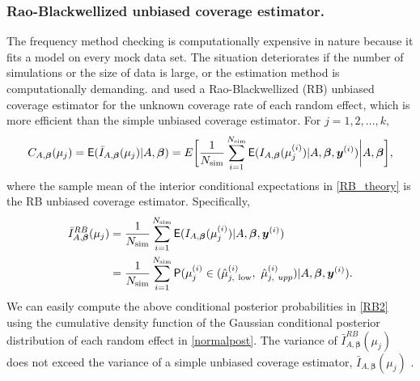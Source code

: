 \documentclass[article]{jss}
\begin{document}
\subsubsection{Rao-Blackwellized unbiased coverage estimator.}
The frequency method checking is computationally expensive in nature because it  fits a model on every mock data set. The situation deteriorates if the number of simulations or the size of data is large, or the estimation method is computationally demanding. \citet{morris1997} and \cite{tang2002fitting} used a Rao-Blackwellized (RB) unbiased coverage estimator for the unknown coverage rate of each random effect, which is more efficient than the simple unbiased coverage estimator.  For $j=1, 2, \ldots, k$,
\begin{equation}\label{RB_theory}
C_{A, \boldsymbol{\beta}}(\mu_j)=\mathsf{E}(\bar{I}_{A, \boldsymbol{\beta}}(\mu_j)\vert A, \boldsymbol{\beta})=E\bigg[\frac{1}{N_{\textrm{sim}}}\sum_{i=1}^{N_{\textrm{sim}}}\mathsf{E}(I_{A, \boldsymbol{\beta}}(\mu_j^{(i)})\vert A, \boldsymbol{\beta}, \boldsymbol{y}^{(i)})\bigg\vert A, \boldsymbol{\beta}\bigg],
\end{equation}
where the sample mean of the interior conditional expectations in \eqref{RB_theory} is the RB unbiased coverage estimator.  Specifically,
\begin{align}
\bar{I}^{RB}_{A, \boldsymbol{\beta}}(\mu_j) &= \frac{1}{N_{\textrm{sim}}}\sum_{i=1}^{N_{\textrm{sim}}}\mathsf{E}(I_{A, \boldsymbol{\beta}}(\mu_j^{(i)})\vert A, \boldsymbol{\beta}, \boldsymbol{y}^{(i)})\label{RB1}\\
&= \frac{1}{N_{\textrm{sim}}}\sum_{i=1}^{N_{\textrm{sim}}} \mathsf{P}(\mu_j^{(i)}\in(\hat{\mu}^{(i)}_{j, ~\textrm{low}}, ~\hat{\mu}^{(i)}_{j, ~upp})\vert A, \boldsymbol{\beta},  \boldsymbol{y}^{(i)}).\label{RB2}
\end{align}
We  can easily compute the above conditional posterior probabilities in \eqref{RB2} using the cumulative density function of the Gaussian conditional posterior distribution of each random effect in  \eqref{normalpost}. The variance of  $\bar{I}^{RB}_{A, \boldsymbol{\beta}}(\mu_j)$ does not exceed the variance of a simple unbiased coverage estimator, $\bar{I}_{A, \boldsymbol{\beta}}(\mu_j)$ \citep{radhakrishna1945information, blackwell1947conditional}.




\end{document}
